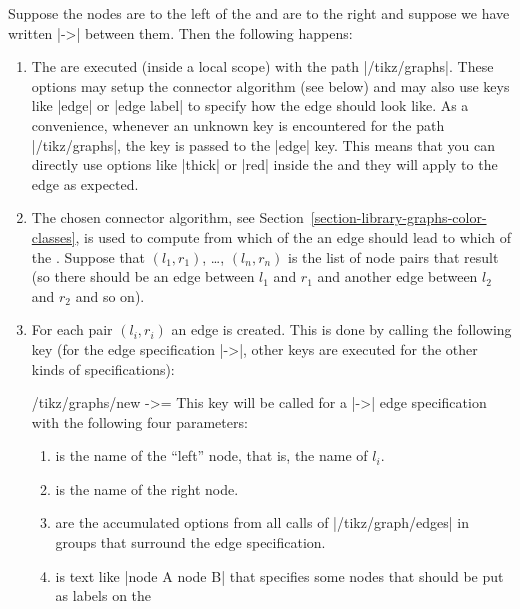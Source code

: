 Suppose the nodes  are to the left of the  and  are to the right and suppose we have
written |->| between them. Then the following happens:
%
\begin{enumerate}
    \item The  are executed (inside a local scope) with the path
        |/tikz/graphs|. These options may setup the connector algorithm (see
        below) and may also use keys like |edge| or |edge label| to specify how
        the edge should look like. As a convenience, whenever an unknown key is
        encountered for the path |/tikz/graphs|, the key is passed to the
        |edge| key. This means that you can directly use options like |thick|
        or |red| inside the  and they will apply to the edge as
        expected.
    \item The chosen connector algorithm, see
        Section~\ref{section-library-graphs-color-classes}, is used to compute
        from which of the  an edge should lead to which of the
        . Suppose that $(l_1,r_1)$, \dots, $(l_n,r_n)$ is the
        list of node pairs that result (so there should be an edge between
        $l_1$ and $r_1$ and another edge between $l_2$ and $r_2$ and so on).
    \item For each pair $(l_i,r_i)$ an edge is created. This is done by calling
        the following key (for the edge specification |->|, other keys are
        executed for the other kinds of specifications):
        \begin{key}{/tikz/graphs/new ->=}
            This key will be called for a |->| edge specification with the
            following four parameters:
            \begin{enumerate}
                \item {} is the name of the ``left'' node, that
                    is, the name of $l_i$.
                \item {} is the name of the right node.
                \item {} are the accumulated options from all
                    calls of |/tikz/graph/edges| in groups that surround the
                    edge specification.
                \item {} is text like |node {A} node {B}| that
                    specifies some nodes that should be put as labels on the

\end{enumerate}
\end{key}
\end{enumerate}
